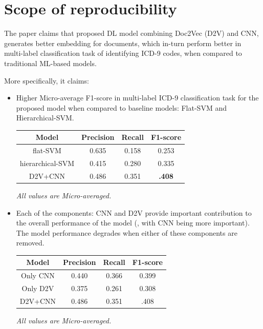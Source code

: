 \documentclass[11pt,a4paper]{article}
\begin{document}
\section{Scope of reproducibility}

The paper claims that proposed DL model combining Doc2Vec (D2V) and CNN, generates better embedding for documents, which in-turn perform better in multi-label classification task of identifying ICD-9 codes, when compared to traditional ML-based models.  

More specifically, it claims:

\begin{itemize}
	\item Higher Micro-average F1-score in multi-label ICD-9 classification task for the proposed model when compared to baseline models: Flat-SVM and Hierarchical-SVM.
\newline

\begin{small}
\begin{tabular}{ cccc }
  \hline
  	Model & Precision & Recall & F1-score \\
  \hline
  	flat-SVM & 0.635 & 0.158 & 0.253 \\ 
  \hline
  	hierarchical-SVM & 0.415 & 0.280 & 0.335 \\ 
  \hline
  	D2V+CNN & 0.486 & 0.351 & \textbf{.408} \\ 
  \hline
\end{tabular}

\textit{All values are Micro-averaged.}
\end{small}

	\item Each of the components: CNN and D2V provide important contribution to the overall performance of the model (, with CNN being more important). The model performance degrades when either of these components are removed.
\newline

\begin{small}
\begin{tabular}{ cccc }
  \hline
  	Model & Precision & Recall & F1-score \\
  \hline
  	Only CNN & 0.440 & 0.366 & 0.399 \\ 
  \hline
  	Only D2V & 0.375 & 0.261 & 0.308 \\ 
  \hline
  	D2V+CNN & 0.486 & 0.351 & .408 \\ 
  \hline
\end{tabular}

\textit{All values are Micro-averaged.}
\end{small}	
\end{itemize}
 
\end{document}
